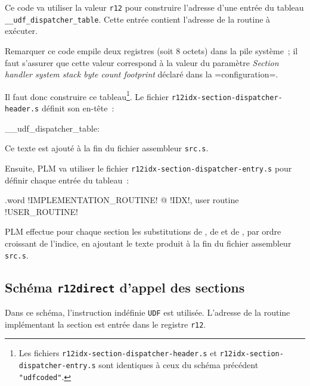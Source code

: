 Ce code va utiliser la valeur \texttt{r12} pour construire l'adresse d'une entrée du tableau \texttt{\_\_udf\_dispatcher\_table}. Cette entrée contient l'adresse de la routine à exécuter.

Remarquer ce code empile deux registres (soit 8 octets) dans la pile système~; il faut s'assurer que cette valeur correspond à la valeur du paramètre \emph{Section handler system stack byte count footprint} déclaré dans la \plm=configuration=.

Il faut donc construire ce tableau\footnote{Les fichiers \texttt{r12idx-section-dispatcher-header.s} et \texttt{r12idx-section-dispatcher-entry.s} sont identiques à ceux du schéma précédent \texttt{"udfcoded"}.}. Le fichier \texttt{r12idx-section-dispatcher-header.s} définit son en-tête~:

\begin{SHELL}\small
\_\_udf\_dispatcher\_table:
\end{SHELL}

Ce texte est ajouté à la fin du fichier assembleur \texttt{src.s}.

Ensuite, PLM va utiliser le fichier \texttt{r12idx-section-dispatcher-entry.s} pour définir chaque entrée du tableau~:
\begin{SHELL}\small
\hspace*{1.2em}.word !IMPLEMENTATION\_ROUTINE! @ !IDX!, user routine !USER\_ROUTINE!

\end{SHELL}

PLM effectue pour chaque section les substitutions de , de  et de , par ordre croissant de l'indice, en ajoutant le texte produit à la fin du fichier assembleur \texttt{src.s}.











\subsection{Schéma \texttt{r12direct} d'appel des sections}

Dans ce schéma, l'instruction indéfinie \texttt{UDF} est utilisée. L'adresse de la routine implémentant la section est entrée dans le registre \texttt{r12}.

